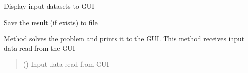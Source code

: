 \documentclass[letterpaper,10pt,english]{sphinxmanual}
\begin{document}
\begin{fulllineitems}
\begin{fulllineitems}
\label{\detokenize{main:main.PyramidsWindow.pasteInputData}}
\pysigstartsignatures
{}
\pysigstopsignatures
\sphinxAtStartPar
Display input datasets to GUI

\end{fulllineitems}


\begin{fulllineitems}
\label{\detokenize{main:main.PyramidsWindow.saveDataToFile}}
\pysigstartsignatures
{}
\pysigstopsignatures
\sphinxAtStartPar
Save the result (if exists) to file

\end{fulllineitems}


\begin{fulllineitems}
\label{\detokenize{main:main.PyramidsWindow.solve}}
\pysigstartsignatures
{}
\pysigstopsignatures
\sphinxAtStartPar
Method solves the problem and prints it to the GUI.
This method receives input data read from the GUI
\begin{quote}\begin{description}
\sphinxAtStartPar
{} ({\hyperref[\detokenize{hints:hints.HintsData}]{}}) \textendash{} Input data read from GUI

\end{description}\end{quote}

\end{fulllineitems}


\end{fulllineitems}
\end{document}
